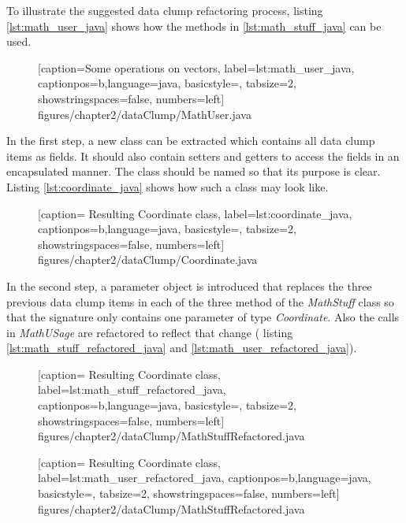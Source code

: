 To illustrate the suggested data clump refactoring process, listing \ref{lst:math_user_java} shows how the methods in \ref{lst:math_stuff_java} can be used. 


  \begin{figure} [htbp!]
			
			[caption={Some operations on vectors},
			label={lst:math_user_java},
			captionpos=b,language=java, basicstyle=\footnotesize, tabsize=2, showstringspaces=false,  numbers=left]
			{figures/chapter2/dataClump/MathUser.java}
	\end{figure}

In the first step, a new class can be extracted which contains all data clump items as fields. It should also contain setters and getters to access the fields in an encapsulated manner. The class should be named so that its purpose is clear. Listing \ref{lst:coordinate_java} shows how such a class may look like. 

  \begin{figure} [htbp!]
			
			[caption={ Resulting Coordinate class},
			label={lst:coordinate_java},
			captionpos=b,language=java, basicstyle=\footnotesize, tabsize=2, showstringspaces=false,  numbers=left]
			{figures/chapter2/dataClump/Coordinate.java}
		\end{figure}

In the second step, a parameter object is introduced that replaces the three previous data clump items in each of the three method of the \textit{MathStuff} class so that the signature only contains one parameter of type \textit{Coordinate}. Also the calls in \textit{MathUSage} are refactored to reflect that change ( listing \ref{lst:math_stuff_refactored_java} and \ref{lst:math_user_refactored_java}). 

  \begin{figure} [htbp!]
			
			[caption={ Resulting Coordinate class},
			label={lst:math_stuff_refactored_java},
			captionpos=b,language=java, basicstyle=\footnotesize, tabsize=2, showstringspaces=false,  numbers=left]
			{figures/chapter2/dataClump/MathStuffRefactored.java}
		\end{figure}
  \begin{figure} [htbp!]
			
			[caption={ Resulting Coordinate class},
			label={lst:math_user_refactored_java},
			captionpos=b,language=java, basicstyle=\footnotesize, tabsize=2, showstringspaces=false,  numbers=left]
			{figures/chapter2/dataClump/MathStuffRefactored.java}
		\end{figure}

